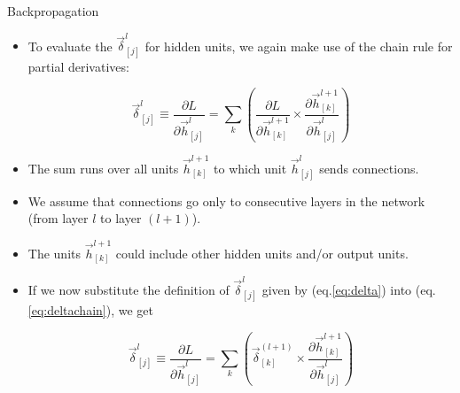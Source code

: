 \documentclass[handout]{beamer}
\begin{document}
\begin{frame}{Backpropagation}
\begin{scriptsize}

\begin{itemize}
 \item To evaluate the $\vec{\delta}_{[j]}^l$ for hidden units, we again make use of the chain rule for partial derivatives:
 
 \begin{equation}
\vec{\delta}_{[j]}^l \equiv \frac{\partial L}{\partial \vec{h}_{[j]}^l} = \sum_{k}\left( \frac{\partial L}{\partial \vec{h}_{[k]}^{l+1}} \times \frac{\partial \vec{h}_{[k]}^{l+1}}{\partial \vec{h}_{[j]}^l}\right)
\label{eq:deltachain}
\end{equation}

\item The sum runs over all units $\vec{h}_{[k]}^{l+1}$ to which unit $\vec{h}_{[j]}^l$ sends connections.

\item We assume that connections go only to consecutive layers in the network (from layer $l$ to layer $(l+1)$).
\item The units $\vec{h}_{[k]}^{l+1}$  could include other hidden units and/or output units.

\item If we now substitute the definition of $\vec{\delta}_{[j]}^l$  given by (eq.\ref{eq:delta}) into (eq.\ref{eq:deltachain}), we get

 \begin{equation}
\vec{\delta}_{[j]}^l \equiv \frac{\partial L}{\partial \vec{h}_{[j]}^l} = \sum_{k}\left( \vec{\delta}_{[k]}^{(l+1)}  \times \frac{\partial \vec{h}_{[k]}^{l+1}}{\partial \vec{h}_{[j]}^l} \right)
\label{eq:delta2}
\end{equation}

\end{itemize}



\end{scriptsize}
\end{frame}
\end{document}

